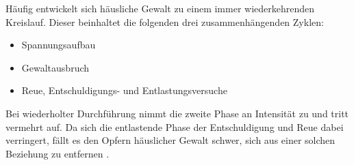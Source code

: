 Häufig entwickelt sich häusliche Gewalt  zu einem immer wiederkehrenden Kreislauf. Dieser beinhaltet die folgenden drei zusammenhängenden Zyklen:
\begin{itemize}
    \item Spannungsaufbau
    \item Gewaltausbruch
    \item Reue, Entschuldigungs- und Entlastungsversuche
\end{itemize}
Bei wiederholter Durchführung nimmt die zweite Phase an Intensität zu und tritt vermehrt auf. Da sich die entlastende Phase der Entschuldigung und Reue dabei verringert, fällt es den Opfern häuslicher Gewalt schwer, sich aus einer solchen Beziehung zu entfernen \parencite{Def_haus_Gewalt}.






